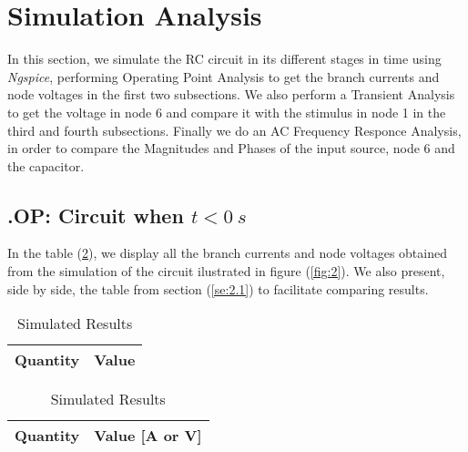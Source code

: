 \section{Simulation Analysis}
\label{sec:simulation}

In this section, we simulate the RC circuit in its different stages in time using \emph{Ngspice},
performing Operating Point Analysis to get the branch currents and node voltages
in the first two subsections. We also perform a Transient Analysis to get the voltage
in node 6 and compare it with the stimulus in node 1 in the third and fourth subsections.
Finally we do an AC Frequency Responce Analysis, in order to compare the Magnitudes
and Phases of the input source, node 6 and the capacitor.

\subsection{.OP: Circuit when $t < 0 \:s$}

In the table (\ref{tab:SimNodMet}), we display all the branch currents and
node voltages obtained from the simulation of the circuit ilustrated in figure (\ref{fig:2}). 
We also present, side by side, the table from section (\ref{se:2.1}) to facilitate comparing results.

\begin{table}[H]
    \caption{Nodal Method Analysis - $t < 0 \: s$}
    \begin{minipage}{.5\linewidth}

        \centering
        \caption{Theoretical Results}
        \begin{tabular}{|l|r|}
            \hline    
            {\bf Quantity} & {\bf Value} \\ \hline
            
        \end{tabular}

    \end{minipage}%
    \begin{minipage}{.5\linewidth}

        \centering
        \caption{Simulated Results}
        \begin{tabular}{|l|r|}
            \hline    
            {\bf Quantity} & {\bf Value [A or V]} \\ \hline
            
        \end{tabular}

    \end{minipage}
    \label{tab:SimNodMet}
\end{table}

